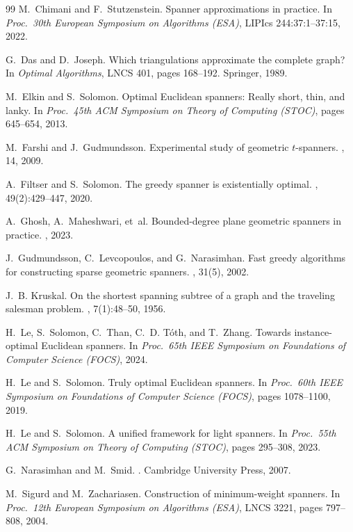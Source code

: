 \documentclass{article}
\begin{document}
\begin{thebibliography}{99}
M.~Chimani and F.~Stutzenstein.
\newblock Spanner approximations in practice.
\newblock In {\em Proc.\ 30th European Symposium on Algorithms (ESA)}, LIPIcs 244:37:1--37:15, 2022.

G.~Das and D.~Joseph.
\newblock Which triangulations approximate the complete graph?
\newblock In {\em Optimal Algorithms}, LNCS 401, pages 168--192. Springer, 1989.

M.~Elkin and S.~Solomon.
\newblock Optimal {E}uclidean spanners: Really short, thin, and lanky.
\newblock In {\em Proc.\ 45th ACM Symposium on Theory of Computing (STOC)}, pages 645--654, 2013.

M.~Farshi and J.~Gudmundsson.
\newblock Experimental study of geometric $t$-spanners.
, 14, 2009.

A.~Filtser and S.~Solomon.
\newblock The greedy spanner is existentially optimal.
, 49(2):429--447, 2020.

A.~Ghosh, A.~Maheshwari, et~al.
\newblock Bounded-degree plane geometric spanners in practice.
, 2023.

J.~Gudmundsson, C.~Levcopoulos, and G.~Narasimhan.
\newblock Fast greedy algorithms for constructing sparse geometric spanners.
, 31(5), 2002.

J.~B. Kruskal.
\newblock On the shortest spanning subtree of a graph and the traveling salesman problem.
, 7(1):48--50, 1956.

H.~Le, S.~Solomon, C.~Than, C.~D. T\'oth, and T.~Zhang.
\newblock Towards instance-optimal {E}uclidean spanners.
\newblock In {\em Proc.\ 65th IEEE Symposium on Foundations of Computer Science (FOCS)}, 2024.

H.~Le and S.~Solomon.
\newblock Truly optimal {E}uclidean spanners.
\newblock In {\em Proc.\ 60th IEEE Symposium on Foundations of Computer Science (FOCS)}, pages 1078--1100, 2019.

H.~Le and S.~Solomon.
\newblock A unified framework for light spanners.
\newblock In {\em Proc.\ 55th ACM Symposium on Theory of Computing (STOC)}, pages 295--308, 2023.

G.~Narasimhan and M.~Smid.
.
\newblock Cambridge University Press, 2007.

M.~Sigurd and M.~Zachariasen.
\newblock Construction of minimum-weight spanners.
\newblock In {\em Proc.\ 12th European Symposium on Algorithms (ESA)}, LNCS 3221, pages 797--808, 2004.

\end{thebibliography}
\end{document}
